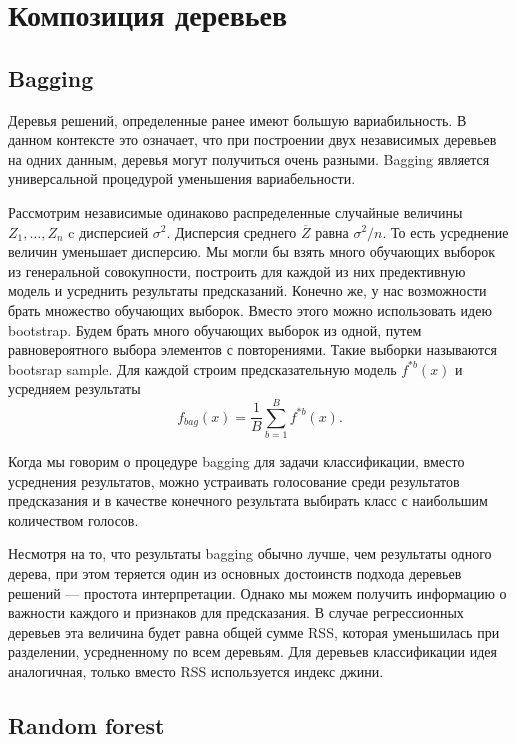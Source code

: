 \documentclass[14pt, a4paper]{article}
\begin{document}
\section{Композиция деревьев}
\subsection{Bagging}

Деревья решений, определенные ранее имеют большую вариабильность. В данном контексте это означает, что при построении двух независимых деревьев на одних данным, деревья могут получиться очень разными. Bagging является универсальной процедурой уменьшения вариабельности. 

Рассмотрим независимые одинаково распределенные случайные величины $Z_1, \ldots, Z_n$ c дисперсией $\sigma^2$. Дисперсия среднего $\overline{Z}$ равна $\sigma^2/n$. То есть усреднение величин уменьшает дисперсию. Мы могли бы взять много обучающих выборок из генеральной совокупности, построить для каждой из них предективную модель и усреднить результаты предсказаний. Конечно же, у нас возможности брать множество обучающих выборок. Вместо этого можно использовать идею bootstrap. Будем брать много обучающих выборок из одной, путем равновероятного выбора элементов с повторениями. Такие выборки называются bootsrap sample. Для каждой строим предсказательную модель $f^{*b} (x)$ и усредняем результаты
\begin{equation}
f_{bag}(x) = \frac{1}{B} \sum_{b = 1}^B f^{*b} (x).
\end{equation}

Когда мы говорим о процедуре bagging для задачи классификации, вместо усреднения результатов, можно устраивать голосование среди результатов предсказания и в качестве конечного результата выбирать класс с наибольшим количеством голосов.

Несмотря на то, что результаты bagging обычно лучше, чем результаты одного дерева, при этом теряется один из основных достоинств подхода деревьев решений --- простота интерпретации. Однако мы можем получить информацию о важности каждого и признаков для предсказания. В случае регрессионных деревьев эта величина будет равна общей сумме RSS, которая уменьшилась при разделении, усредненному по всем деревьям. Для деревьев классификации идея аналогичная, только вместо RSS используется индекс джини.

\subsection{Random forest}
\end{document}
